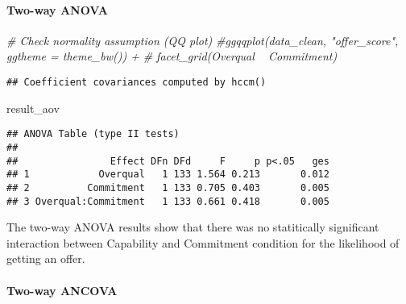 \documentclass[]{article}
\newenvironment{Shaded}{\begin{snugshade}}{\end{snugshade}}
\newcommand{\CommentTok}[1]{\textcolor[rgb]{0.56,0.35,0.01}{\textit{#1}}}
\newcommand{\KeywordTok}[1]{\textcolor[rgb]{0.13,0.29,0.53}{\textbf{#1}}}
\newcommand{\NormalTok}[1]{#1}
\newcommand{\OperatorTok}[1]{\textcolor[rgb]{0.81,0.36,0.00}{\textbf{#1}}}
\newcommand{\StringTok}[1]{\textcolor[rgb]{0.31,0.60,0.02}{#1}}
\let\oldparagraph\paragraph
\renewcommand{\paragraph}[1]{\oldparagraph{#1}\mbox{}}
\begin{document}
\hypertarget{two-way-anova}{%
\paragraph{Two-way ANOVA}\label{two-way-anova}}

\begin{Shaded}
\begin{Highlighting}[]
\CommentTok{# Check normality assumption (QQ plot)}
\CommentTok{#ggqqplot(data_clean, "offer_score", ggtheme = theme_bw()) +}
\CommentTok{#  facet_grid(Overqual ~ Commitment)}
\end{Highlighting}
\end{Shaded}

\begin{Shaded}
\end{Shaded}

\begin{verbatim}
## Coefficient covariances computed by hccm()
\end{verbatim}

\begin{Shaded}
\begin{Highlighting}[]
\NormalTok{result_aov}
\end{Highlighting}
\end{Shaded}

\begin{verbatim}
## ANOVA Table (type II tests)
## 
##                Effect DFn DFd     F     p p<.05   ges
## 1            Overqual   1 133 1.564 0.213       0.012
## 2          Commitment   1 133 0.705 0.403       0.005
## 3 Overqual:Commitment   1 133 0.661 0.418       0.005
\end{verbatim}

The two-way ANOVA results show that there was no statitically
significant interaction between Capability and Commitment condition for
the likelihood of getting an offer.

\hypertarget{two-way-ancova}{%
\paragraph{Two-way ANCOVA}\label{two-way-ancova}}
\end{document}
